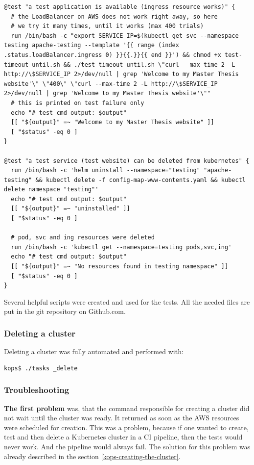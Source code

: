 \begin{lstlisting}[basicstyle=\tiny,caption={Bats-core tests}]
@test "a test application is available (ingress resource works)" {
  # the LoadBalancer on AWS does not work right away, so here
  # we try it many times, until it works (max 400 trials)
  run /bin/bash -c "export SERVICE_IP=$(kubectl get svc --namespace testing apache-testing --template '{{ range (index .status.loadBalancer.ingress 0) }}{{.}}{{ end }}') && chmod +x test-timeout-until.sh && ./test-timeout-until.sh \"curl --max-time 2 -L http://\$SERVICE_IP 2>/dev/null | grep 'Welcome to my Master Thesis website'\" \"400\" \"curl --max-time 2 -L http://\$SERVICE_IP 2>/dev/null | grep 'Welcome to my Master Thesis website'\""
  # this is printed on test failure only
  echo "# test cmd output: $output"
  [[ "${output}" =~ "Welcome to my Master Thesis website" ]]
  [ "$status" -eq 0 ]
}

@test "a test service (test website) can be deleted from kubernetes" {
  run /bin/bash -c 'helm uninstall --namespace="testing" "apache-testing" && kubectl delete -f config-map-www-contents.yaml && kubectl delete namespace "testing"'
  echo "# test cmd output: $output"
  [[ "${output}" =~ "uninstalled" ]]
  [ "$status" -eq 0 ]

  # pod, svc and ing resources were deleted
  run /bin/bash -c 'kubectl get --namespace=testing pods,svc,ing'
  echo "# test cmd output: $output"
  [[ "${output}" =~ "No resources found in testing namespace" ]]
  [ "$status" -eq 0 ]
}
\end{lstlisting}
Several helpful scripts were created and used for the tests. All the needed files are put in the git repository on Github.com.


\subsubsection{Deleting a cluster}

Deleting a cluster was fully automated and performed with:

\begin{lstlisting}[basicstyle=\tiny,caption={Testing a kops cluster}]
kops$ ./tasks _delete
\end{lstlisting}

\subsubsection{Troubleshooting}
\label{kops-troubleshooting}

\textbf{The first problem} was, that the command responsible for creating a cluster did not wait until the cluster was ready. It returned as soon as the AWS resources were scheduled for creation. This was a problem, because if one wanted to create, test and then delete a Kubernetes cluster in a CI pipeline, then the tests would never work. And the pipeline would always fail. The solution for this problem was already described in the section \ref{kops-creating-the-cluster}.

